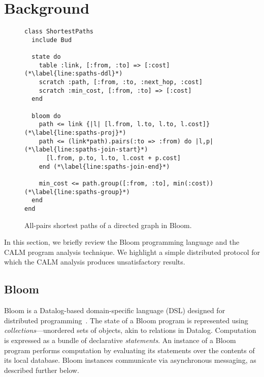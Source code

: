 \section{Background}
\label{sec:background}

\begin{figure}[t]
\begin{scriptsize}
\begin{lstlisting}
class ShortestPaths
  include Bud

  state do
    table :link, [:from, :to] => [:cost] (*\label{line:spaths-ddl}*)
    scratch :path, [:from, :to, :next_hop, :cost]
    scratch :min_cost, [:from, :to] => [:cost]
  end

  bloom do
    path <= link {|l| [l.from, l.to, l.to, l.cost]} (*\label{line:spaths-proj}*)
    path <= (link*path).pairs(:to => :from) do |l,p| (*\label{line:spaths-join-start}*)
      [l.from, p.to, l.to, l.cost + p.cost]
    end (*\label{line:spaths-join-end}*)

    min_cost <= path.group([:from, :to], min(:cost)) (*\label{line:spaths-group}*)
  end
end
\end{lstlisting}
\end{scriptsize}
\caption{All-pairs shortest paths of a directed graph in Bloom.}
\label{fig:bloom-spaths}
\end{figure}

In this section, we briefly review the Bloom programming language and the CALM
program analysis technique.  We highlight a simple distributed protocol for
which the CALM analysis produces unsatisfactory results.

\subsection{Bloom}
\label{sec:bg-bloom}

Bloom is a Datalog-based domain-specific language (DSL) designed for distributed
programming~\cite{Alvaro2011,bloom}. The state of a Bloom program is represented
using \emph{collections}---unordered sets of objects, akin to relations in
Datalog. Computation is expressed as a bundle of declarative \emph{statements}.
An instance of a Bloom program performs computation by evaluating its statements
over the contents of its local database. Bloom instances communicate via
asynchronous messaging, as described further below.

